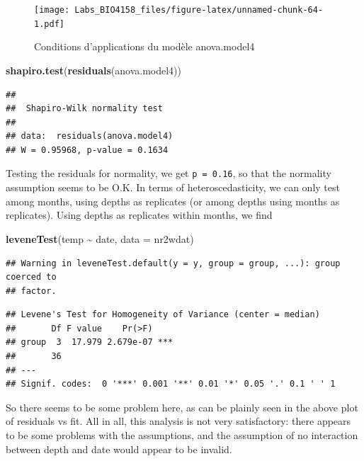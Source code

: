 \documentclass[
  12pt,
]{book}
\newenvironment{Shaded}{\begin{snugshade}}{\end{snugshade}}
\newcommand{\DataTypeTok}[1]{\textcolor[rgb]{0.13,0.29,0.53}{#1}}
\newcommand{\KeywordTok}[1]{\textcolor[rgb]{0.13,0.29,0.53}{\textbf{#1}}}
\newcommand{\NormalTok}[1]{#1}
\newcommand{\OperatorTok}[1]{\textcolor[rgb]{0.81,0.36,0.00}{\textbf{#1}}}
\newcommand{\StringTok}[1]{\textcolor[rgb]{0.31,0.60,0.02}{#1}}
\begin{document}
\begin{figure}
\centering
\texttt{[image: Labs\_BIO4158\_files/figure-latex/unnamed-chunk-64-1.pdf]}
\caption{\label{fig:unnamed-chunk-64}Conditions d'applications du modèle anova.model4}
\end{figure}

\begin{Shaded}
\begin{Highlighting}[]
\KeywordTok{shapiro.test}\NormalTok{(}\KeywordTok{residuals}\NormalTok{(anova.model4))}
\end{Highlighting}
\end{Shaded}

\begin{verbatim}
## 
##  Shapiro-Wilk normality test
## 
## data:  residuals(anova.model4)
## W = 0.95968, p-value = 0.1634
\end{verbatim}

Testing the residuals for normality, we get \texttt{p\ =\ 0.16}, so that the normality assumption seems to be O.K. In terms of heteroscedasticity, we can only test among months, using depths as replicates (or among depths using months as replicates). Using depths as replicates within months, we find

\begin{Shaded}
\begin{Highlighting}[]
\KeywordTok{leveneTest}\NormalTok{(temp }\OperatorTok{\textasciitilde{}}\StringTok{ }\NormalTok{date, }\DataTypeTok{data =}\NormalTok{ nr2wdat)}
\end{Highlighting}
\end{Shaded}

\begin{verbatim}
## Warning in leveneTest.default(y = y, group = group, ...): group coerced to
## factor.
\end{verbatim}

\begin{verbatim}
## Levene's Test for Homogeneity of Variance (center = median)
##       Df F value    Pr(>F)    
## group  3  17.979 2.679e-07 ***
##       36                      
## ---
## Signif. codes:  0 '***' 0.001 '**' 0.01 '*' 0.05 '.' 0.1 ' ' 1
\end{verbatim}

So there seems to be some problem here, as can be plainly seen in the above plot of residuals vs fit. All in all, this analysis is not very satisfactory: there appears to be some problems with the assumptions, and the assumption of no interaction between depth and date would appear to be invalid.
\end{document}
